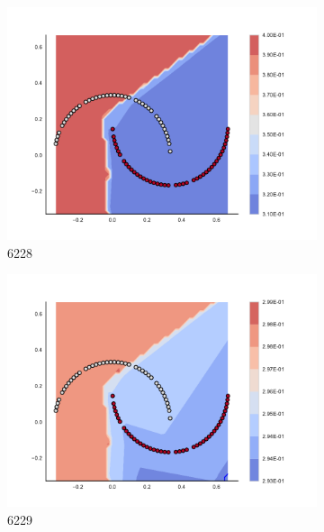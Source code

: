 \begin{figure}[h]
\begin{subfigure}[b]{0.09\textwidth}
    \includegraphics[clip, trim=2.35cm 1.75cm 4.5cm 0cm,width=\textwidth]{img/convergence/6228.pdf}
    \caption{6228}
    \label{fig:convergence_6228}
\end{subfigure}
%
\begin{subfigure}[b]{0.09\textwidth}
    \includegraphics[clip, trim=2.35cm 1.75cm 4.5cm 0cm,width=\textwidth]{img/convergence/6229.pdf}
    \caption{6229}
    \label{fig:convergence_6229}
\end{subfigure}
%
\begin{subfigure}[b]{0.09\textwidth}

\end{subfigure}
\end{figure}
